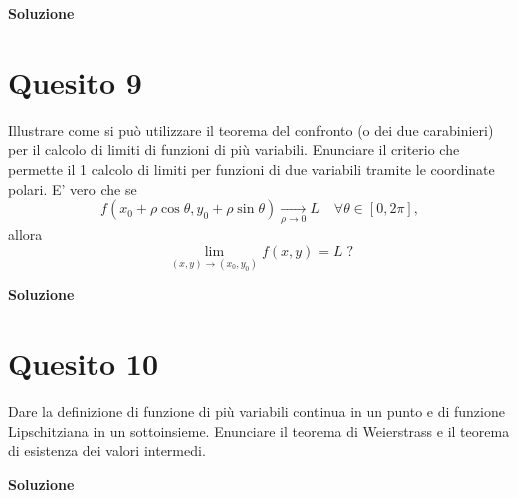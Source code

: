 \medskip
\begin{large}
\textbf{Soluzione}
\end{large}


\section*{Quesito 9}
Illustrare come si può utilizzare il teorema del confronto (o dei due carabinieri)
per il calcolo di limiti di funzioni di più variabili. Enunciare il criterio che permette il
1
calcolo di limiti per funzioni di due variabili tramite le coordinate polari. E’ vero che se
\[
f(x_0+\rho\cos \theta, y_0+\rho\sin\theta) \xrightarrow[\rho\to 0]{} L \quad \forall\theta\in [0,2\pi],   
\]
allora
\[
    \lim_{(x,y)\to(x_0,y_0)} f(x,y)=L \; ?
\]

\medskip
\begin{large}
\textbf{Soluzione}
\end{large}


\section*{Quesito 10}
Dare la definizione di funzione di più variabili continua in un punto e di
funzione Lipschitziana in un sottoinsieme. Enunciare il teorema di Weierstrass e il teorema
di esistenza dei valori intermedi.

\medskip
\begin{large}
\textbf{Soluzione}
\end{large}
